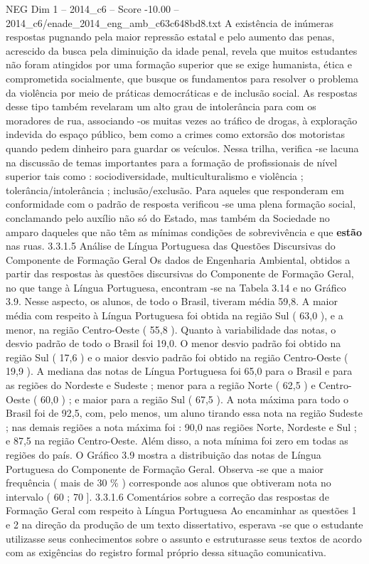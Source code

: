 \begin{textsample}{NEG Dim 1 – 2014\_c6 – Score -10.00 – 2014\_c6/enade\_2014\_eng\_amb\_c63c648bd8.txt}
A existência de inúmeras respostas pugnando pela maior repressão estatal e pelo aumento das penas, acrescido da busca pela diminuição da idade penal, revela que muitos estudantes não foram atingidos por uma formação superior que se exige humanista, ética e comprometida socialmente, que busque os fundamentos para resolver o problema da violência por meio de práticas democráticas e de inclusão social.
As respostas desse tipo também revelaram um alto grau de intolerância para com os moradores de rua, associando -os muitas vezes ao tráfico de drogas, à exploração indevida do espaço público, bem como a crimes como extorsão dos motoristas quando pedem dinheiro para guardar os veículos.
Nessa trilha, verifica -se lacuna na discussão de temas importantes para a formação de profissionais de nível superior tais como : sociodiversidade, multiculturalismo e violência ; tolerância/intolerância ; inclusão/exclusão.
Para aqueles que responderam em conformidade com o padrão de resposta verificou -se uma plena formação social, conclamando pelo auxílio não só do Estado, mas também da Sociedade no amparo daqueles que não têm as mínimas condições de sobrevivência e que \textbf{estão} nas ruas. 3.3.1.5 Análise de Língua Portuguesa das Questões Discursivas do Componente de Formação Geral Os dados de Engenharia Ambiental, obtidos a partir das respostas às questões discursivas do Componente de Formação Geral, no que tange à Língua Portuguesa, encontram -se na Tabela 3.14 e no Gráfico 3.9.
Nesse aspecto, os alunos, de todo o Brasil, tiveram média 59,8.
A maior média com respeito à Língua Portuguesa foi obtida na região Sul ( 63,0 ), e a menor, na região Centro-Oeste ( 55,8 ).
Quanto à variabilidade das notas, o desvio padrão de todo o Brasil foi 19,0.
O menor desvio padrão foi obtido na região Sul ( 17,6 ) e o maior desvio padrão foi obtido na região Centro-Oeste ( 19,9 ).
A mediana das notas de Língua Portuguesa foi 65,0 para o Brasil e para as regiões do Nordeste e Sudeste ; menor para a região Norte ( 62,5 ) e Centro-Oeste ( 60,0 ) ; e maior para a região Sul ( 67,5 ).
A nota máxima para todo o Brasil foi de 92,5, com, pelo menos, um aluno tirando essa nota na região Sudeste ; nas demais regiões a nota máxima foi : 90,0 nas regiões Norte, Nordeste e Sul ; e 87,5 na região Centro-Oeste.
Além disso, a nota mínima foi zero em todas as regiões do país.
O Gráfico 3.9 mostra a distribuição das notas de Língua Portuguesa do Componente de Formação Geral.
Observa -se que a maior frequência ( mais de 30 \% ) corresponde aos alunos que obtiveram nota no intervalo ( 60 ; 70 ]. 3.3.1.6 Comentários sobre a correção das respostas de Formação Geral com respeito à Língua Portuguesa Ao encaminhar as questões 1 e 2 na direção da produção de um texto dissertativo, esperava -se que o estudante utilizasse seus conhecimentos sobre o assunto e estruturasse seus textos de acordo com as exigências do registro formal próprio dessa situação comunicativa.

\end{textsample}
